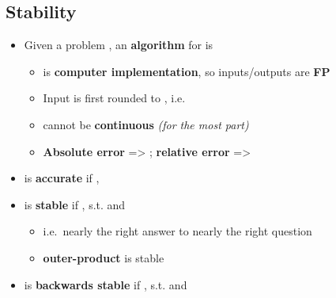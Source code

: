 \subsection*{Stability}

\begin{itemize}

  \item
        Given a problem , an \textbf{algorithm} for
         is 

        \begin{itemize}

          \item
                 is \textbf{computer implementation}, so
                inputs/outputs are \textbf{FP}
          \item
                Input  is first rounded to ,
                i.e.~
          \item
                 cannot be \textbf{continuous} \emph{(for the most
                  part)}
          \item
                \textbf{Absolute error} =\textgreater{}
                ; \textbf{relative error}
                =\textgreater{} 
        \end{itemize}
  \item
         is \textbf{accurate} if ,
  \item
         is \textbf{stable} if ,
         s.t.
        and

        \begin{itemize}

          \item
                i.e.~nearly the right answer to nearly the right question
          \item
                \textbf{outer-product} is stable
        \end{itemize}
  \item
         is \textbf{backwards stable} if
        ,  s.t.
         and


\end{itemize}
